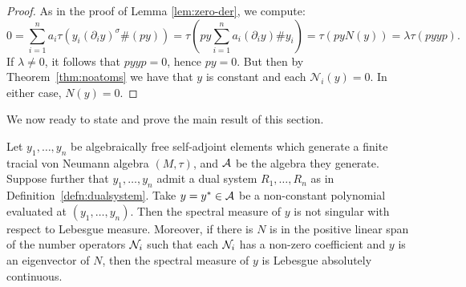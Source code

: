 \begin{proof}
	As in the proof of Lemma \ref{lem:zero-der}, we compute:
	$$
	0 = \sum_{i=1}^n a_i\tau\left(y_i(\partial_iy)^\sigma\#(py)\right)
	= \tau\left( py \sum_{i=1}^n a_i(\partial_i y)\#y_i \right)
	= \tau\left( py N(y) \right)
	= \lambda \tau\left( pyyp \right).
	$$
	If $\lambda \neq 0$, it follows that $pyyp = 0$, hence $py = 0$.
	But then by Theorem~\ref{thm:noatoms} we have that $y$ is constant and each $\mathcal{N}_i(y) = 0$.
	In either case, $N(y) = 0$.
\end{proof}

We now ready to state and prove the main result of this section.
\begin{theorem}
	Let $y_1, \ldots, y_n$ be algebraically free self-adjoint elements which generate a finite tracial von Neumann algebra $(M, \tau)$, and $\mathcal{A}$ be the algebra they generate.
	Suppose further that $y_1, \ldots, y_n$ admit a dual system $R_1, \ldots, R_n$ as in Definition~\ref{defn:dualsystem}.
	Take $y = y^* \in \mathcal{A}$ be a non-constant polynomial evaluated at $(y_1, \ldots, y_n)$.
	Then the spectral measure of $y$ is not singular with respect to Lebesgue measure.
	Moreover, if there is $N$ is in the positive linear span of the number operators $\mathcal{N}_i$ such that each $\mathcal{N}_i$ has a non-zero coefficient and $y$ is an eigenvector of $N$, then the spectral measure of $y$ is Lebesgue absolutely continuous.
\end{theorem}

